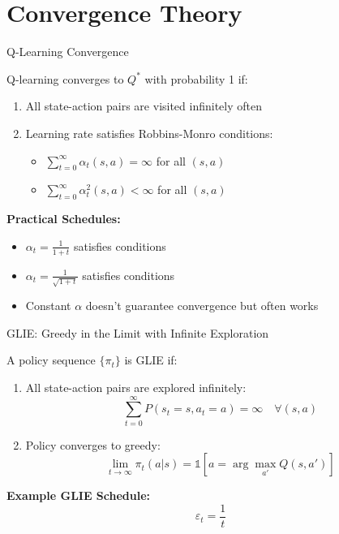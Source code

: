 \documentclass[aspectratio=169,10pt]{beamer}
\begin{document}
\section{Convergence Theory}

\begin{frame}{Q-Learning Convergence}
\begin{theorem}
Q-learning converges to $Q^*$ with probability 1 if:
\begin{enumerate}
    \item All state-action pairs are visited infinitely often
    \item Learning rate satisfies Robbins-Monro conditions:
    \begin{itemize}
        \item $\sum_{t=0}^{\infty} \alpha_t(s,a) = \infty$ for all $(s,a)$
        \item $\sum_{t=0}^{\infty} \alpha_t^2(s,a) < \infty$ for all $(s,a)$
    \end{itemize}
\end{enumerate}
\end{theorem}

\textbf{Practical Schedules:}
\begin{itemize}
    \item $\alpha_t = \frac{1}{1+t}$ satisfies conditions
    \item $\alpha_t = \frac{1}{\sqrt{1+t}}$ satisfies conditions
    \item Constant $\alpha$ doesn't guarantee convergence but often works
\end{itemize}
\end{frame}

\begin{frame}{GLIE: Greedy in the Limit with Infinite Exploration}
\begin{definition}[GLIE]
A policy sequence $\{\pi_t\}$ is GLIE if:
\begin{enumerate}
    \item All state-action pairs are explored infinitely:
    $$\sum_{t=0}^{\infty} P(s_t=s, a_t=a) = \infty \quad \forall (s,a)$$
    \item Policy converges to greedy:
    $$\lim_{t \to \infty} \pi_t(a|s) = \mathbb{1}[a = \arg\max_{a'} Q(s,a')]$$
\end{enumerate}
\end{definition}

\textbf{Example GLIE Schedule:}
$$\varepsilon_t = \frac{1}{t}$$
\end{frame}
\end{document}

